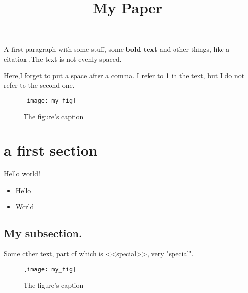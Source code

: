 \documentclass{article}
\begin{document}
\title{My Paper}
\maketitle

A first paragraph with some stuff, some \textbf{bold text}   and other things, like a citation\cite{my:paper} .The text is  not evenly spaced.

Here,I forget to put a space after a comma. I refer to \ref{fig:thisfig1} in the text, but I do not refer to the second one.

\begin{figure}
\texttt{[image: my\_fig]}
\caption{The figure's caption}
\label{fig:thisfig1}
\end{figure}

\section{a first section}

Hello world!

\begin{itemize}
\item Hello %
\item   World
\end{itemize}

\subsection{ My subsection. }

Some other text, part of which is <<special>>, very "special".

\begin{figure}
\texttt{[image: my\_fig]}
\caption{The figure's caption}
\label{fig:thisfig2}
\end{figure}
\end{document}

